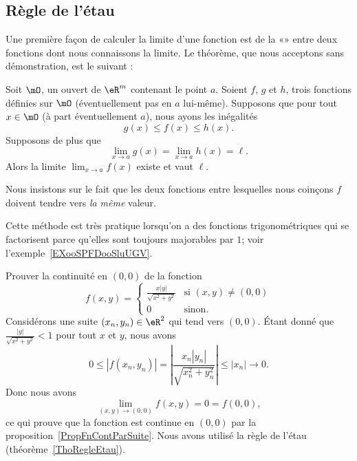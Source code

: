 \subsection{Règle de l'étau}

Une première façon de calculer la limite d'une fonction est de la «» entre deux fonctions dont nous connaissons la limite. Le théorème, que nous acceptons sans démonstration, est le suivant :
\begin{theorem}		\label{ThoRegleEtau}
	Soit $\mO$, un ouvert de $\eR^m$ contenant le point $a$. Soient $f$, $g$ et $h$, trois fonctions définies sur $\mO$ (éventuellement pas en $a$ lui-même). Supposons que pour tout $x\in\mO$ (à part éventuellement $a$), nous ayons les inégalités
	\begin{equation}
		g(x)\leq f(x)\leq h(x).
	\end{equation}
	Supposons de plus que
	\begin{equation}
		\lim_{x\to a} g(x)=\lim_{x\to a} h(x)=\ell.
	\end{equation}
	Alors la limite $\lim_{x\to a} f(x)$ existe et vaut $\ell$.
\end{theorem}

Nous insistons sur le fait que les deux fonctions entre lesquelles nous coinçons $f$ doivent tendre vers \emph{la même} valeur.

Cette méthode est très pratique lorsqu'on a des fonctions trigonométriques qui se factorisent parce qu'elles sont toujours majorables par $1$; voir l'exemple~\ref{EXooSPFDooSluUGV}.

\begin{example}
	Prouver la continuité en $(0,0)$ de la fonction
	\begin{equation}
		f(x,y)=\begin{cases}
			\frac{ x | y | }{ \sqrt{x^2+y^2} }	&	\text{si }(x,y)\neq (0,0)\\
			0	&	 \text{sinon.}
		\end{cases}
	\end{equation}
	Considérons une suite $(x_n,y_n)\in\eR^2$ qui tend vers $(0,0)$. Étant donné que $\frac{ | y | }{ \sqrt{x^2+y^2} }<1$ pour tout $x$ et $y$, nous avons
	\begin{equation}
		0\leq | f(x_n,y_n) |=\left| \frac{ x_n | y_n | }{ \sqrt{x_n^2+y_n^2} } \right| \leq | x_n |\to 0.
	\end{equation}
	Donc nous avons
	\begin{equation}
		\lim_{(x,y)\to(0,0)}f(x,y)=0=f(0,0),
	\end{equation}
	ce qui prouve que la fonction est continue en $(0,0)$ par la proposition~\ref{PropFnContParSuite}. Nous avons utilisé la règle de l'étau (théorème~\ref{ThoRegleEtau}).
\end{example}

